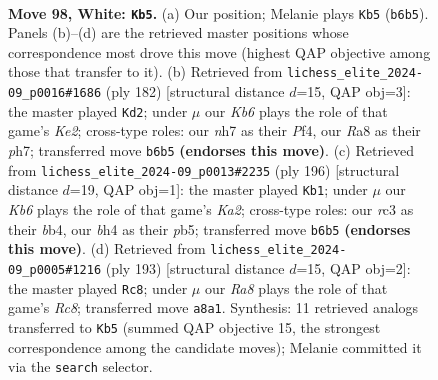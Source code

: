 \documentclass[11pt]{article}
\begin{document}
\clearpage

\begin{figure}[p]\centering
\begin{subfigure}{0.46\textwidth}\centering
\resizebox{\linewidth}{!}{%
\newchessgame
\chessboard[
  setfen={R7/7n/1K5p/4p3/3p2kb/2r5/8/8 w - - 14 98},
  showmover=false,
  pgfstyle=straightmove, color=movearrow, markmove={b6-b5}
]}
\caption{}
\end{subfigure}\hfill
\begin{subfigure}{0.46\textwidth}\centering
\resizebox{\linewidth}{!}{%
\newchessgame
\chessboard[
  setfen={8/7p/5k2/2p2b2/1pP2P2/r7/4K3/8 w - - 2 92},
  showmover=false,
  pgfstyle=straightmove, color=movearrow, markmove={e2-d2}
]}
\caption{}
\end{subfigure}
\\[4pt]
\begin{subfigure}{0.46\textwidth}\centering
\resizebox{\linewidth}{!}{%
\newchessgame
\chessboard[
  setfen={3k4/8/7p/pp4p1/1b6/8/K7/8 w - - 8 99},
  showmover=false,
  pgfstyle=straightmove, color=movearrow, markmove={a2-b1}
]}
\caption{}
\end{subfigure}\hfill
\begin{subfigure}{0.46\textwidth}\centering
\resizebox{\linewidth}{!}{%
\newchessgame
\chessboard[
  setfen={8/5k2/1R6/6Pp/4BK1P/8/8/2r5 b - - 2 97},
  showmover=false,
  pgfstyle=straightmove, color=movearrow, markmove={c1-c8}
]}
\caption{}
\end{subfigure}
\caption{\textbf{Move 98, White: \texttt{Kb5}.} (a) Our position; Melanie plays \texttt{Kb5} (\texttt{b6b5}). Panels (b)--(d) are the retrieved master positions whose correspondence most drove this move (highest QAP objective among those that transfer to it). (b) Retrieved from \texttt{lichess\_elite\_2024-09\_p0016\#1686} (ply 182) [structural distance $d$=15, QAP obj=3]: the master played \texttt{Kd2}; under $\mu$ our \emph{Kb6} plays the role of that game's \emph{Ke2}; cross-type roles: our \emph{n}h7 as their \emph{P}f4, our \emph{R}a8 as their \emph{p}h7; transferred move \texttt{b6b5} \textbf{(endorses this move)}. (c) Retrieved from \texttt{lichess\_elite\_2024-09\_p0013\#2235} (ply 196) [structural distance $d$=19, QAP obj=1]: the master played \texttt{Kb1}; under $\mu$ our \emph{Kb6} plays the role of that game's \emph{Ka2}; cross-type roles: our \emph{r}c3 as their \emph{b}b4, our \emph{b}h4 as their \emph{p}b5; transferred move \texttt{b6b5} \textbf{(endorses this move)}. (d) Retrieved from \texttt{lichess\_elite\_2024-09\_p0005\#1216} (ply 193) [structural distance $d$=15, QAP obj=2]: the master played \texttt{Rc8}; under $\mu$ our \emph{Ra8} plays the role of that game's \emph{Rc8}; transferred move \texttt{a8a1}. Synthesis: 11 retrieved analogs transferred to \texttt{Kb5} (summed QAP objective 15, the strongest correspondence among the candidate moves); Melanie committed it via the \texttt{search} selector.}
\label{fig:thought-m194}
\end{figure}
\end{document}

